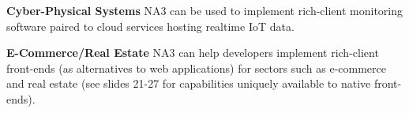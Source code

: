 \begin{frame}{}
{\begin{minipage}{.99\textwidth}
{\begin{enumerate}
\vspace{14pt}
\dmitem \textbf{Cyber-Physical Systems}  \hspace{.5em} 
NA3 can be used to implement rich-client monitoring 
software paired to cloud services hosting 
realtime IoT data.

\vspace{14pt}
\dmitem \textbf{E-Commerce/Real Estate}  \hspace{.5em} 
NA3 can help developers implement 
rich-client front-ends (as 
alternatives to web applications) for sectors such 
as e-commerce and real estate (see slides 21-27 
for capabilities uniquely available to native front-ends).
\end{enumerate}
}

\end{minipage}
}


\end{frame}
